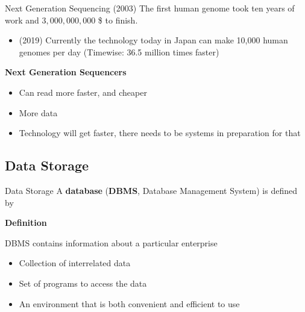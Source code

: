 \documentclass{beamer}
\begin{document}
    \begin{frame}{Next Generation Sequencing}
    (2003) The first human genome took ten years of work and $3,000,000,000$ \$ to finish.
    \begin{itemize}
        \item (2019) Currently the technology today in Japan can make 10,000 human genomes per day (Timewise: 36.5 million times faster) \cite[p.~19]{introgenomics}
    \end{itemize}
    \textbf{Next Generation Sequencers}
        \begin{itemize}
        \item Can read more faster, and cheaper
        \item More data
        \item Technology will get faster, there needs to be systems in preparation for that
    \end{itemize}
    \end{frame}
    
    \subsection{Data Storage}
    \begin{frame}{Data Storage}
        A \textbf{database} (\textbf{DBMS}, Database Management System) is defined by 
        \begin{block} {\textbf{Definition}}

        DBMS contains information about a particular enterprise
        \begin{itemize}
            \item Collection of interrelated data
            \item Set of programs to access the data 
            \item An environment that is both convenient and efficient to use
        \end{itemize}
        \cite{Silberschatz2010}
        \end{block}
    \end{frame}
    
\end{document}
